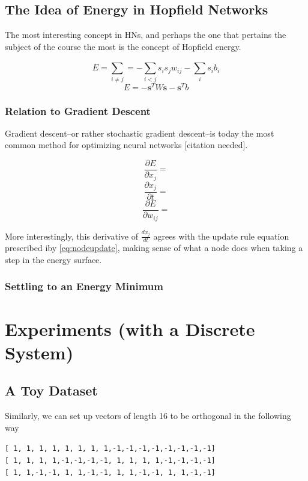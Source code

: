 \documentclass[11pt]{article}
\begin{document}
	
	\subsection{The Idea of Energy in Hopfield Networks}
	The most interesting concept in HNs, and perhaps the one that pertains the subject of the course the most is the concept of Hopfield energy. 
	
	\begin{equation}
		E = \sum^{}_{i \neq j}= - \sum^{}_{i < j} s_i s_j w_{ij} - \sum^{}_{i} s_i b_i
	\end{equation}	
	\begin{equation}
		E = -\mathbf{s}^T W\mathbf{s} - \mathbf{s}^T b	
	\end{equation}
	
	\subsubsection{Relation to Gradient Descent}
	Gradient descent–or rather stochastic gradient descent–is today the most common method for optimizing neural networks [citation needed]. 
	
	\begin{equation}
		\frac{\partial E}{\partial x_j} = 
	\end{equation}
	\begin{equation}
		\frac{\partial x_j}{\partial t} = 
	\end{equation}
	\begin{equation}
		\frac{\partial E}{\partial w_{ij}} = 
	\end{equation}
	
	More interestingly, this derivative of $\frac{d x_j}{dt}$ agrees with the update rule equation prescribed iby \ref{eq:nodeupdate}, making sense of what a node does when taking a step in the energy surface. 	
	
	\subsubsection{Settling to an Energy Minimum}
	
	
	\section{Experiments (with a Discrete System)}
	\subsection{A Toy Dataset}
	Similarly, we can set up vectors of length 16 to be orthogonal in the following way	
	\begin{center}
	\texttt{[\ 1,\ 1,\ 1,\ 1,\ 1,\ 1,\ 1,\ 1,-1,-1,-1,-1,-1,-1,-1,-1]}\\
	\texttt{[\ 1,\ 1,\ 1,\ 1,-1,-1,-1,-1,\ 1,\ 1,\ 1,\ 1,-1,-1,-1,-1]}\\
	\texttt{[\ 1,\ 1,-1,-1,\ 1,\ 1,-1,-1,\ 1,\ 1,-1,-1,\ 1,\ 1,-1,-1]}
	\end{center}
\end{document}
